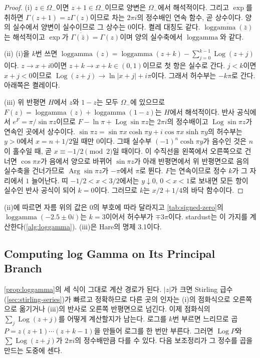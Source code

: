 \begin{proof}
(i) $z\in\Omega_-$이면 $z+1\in\Omega_-$이므로 양변은 $\Omega_-$에서 해석적이다. 그리고 $\exp$를 취하면 $\Gamma(z+1)=z\Gamma(z)$이므로 차는 $2\pi i$의 정수배인 연속 함수, 곧 상수이다. 양의 실수에서 양변이 실수이므로 그 상수는 $0$이다. 켤레 대칭도 같다. $\overline{\operatorname{loggamma}(\bar z)}$는 해석적이고 $\exp$가 $\overline{\Gamma(\bar z)}=\Gamma(z)$이며 양의 실수축에서 $\operatorname{loggamma}$와 같다.

(ii) (i)을 $k$번 쓰면 $\operatorname{loggamma}(z)=\operatorname{loggamma}(z+k)-\sum_{j=0}^{k-1}\operatorname{Log}(z+j)$이다. $z\to x+i0$이면 $z+k\to x+k\in(0,1)$이므로 첫 항은 실수로 간다. $j<k$이면 $x+j<0$이므로 $\operatorname{Log}(z+j)\to\ln|x+j|+i\pi$이다. 그래서 허수부는 $-k\pi$로 간다. 아래쪽은 켤레이다.

(iii) 위 반평면 $H$에서 $z$와 $1-z$는 모두 $\Omega_-$에 있으므로 $F(z)=\operatorname{loggamma}(z)+\operatorname{loggamma}(1-z)$는 $H$에서 해석적이다. 반사 공식에서 $e^F=\pi/\sin\pi z$이므로 $F-\ln\pi+\operatorname{Log}\sin\pi z$는 $2\pi i$의 정수배이고 $\operatorname{Log}\sin\pi z$가 연속인 곳에서 상수이다. $\sin\pi z=\sin\pi x\cosh\pi y+i\cos\pi x\sinh\pi y$의 허수부는 $y>0$에서 $x=n+1/2$일 때만 $0$이다. 그때 실수부 $(-1)^n\cosh\pi y$가 음수인 것은 $n$이 홀수일 때, 곧 $x\equiv-1/2\pmod2$일 때이다. 이 수직선을 왼쪽에서 오른쪽으로 건너면 $\cos\pi x$가 음에서 양으로 바뀌어 $\sin\pi z$가 아래 반평면에서 위 반평면으로 음의 실수축을 건너가므로 $\operatorname{Arg}\sin\pi z$가 $-\pi$에서 $\pi$로 뛴다. $F$는 연속이므로 정수 $k$가 그 자리에서 $1$ 늘어난다. 띠 $-1/2<x<3/2$에서는 $y\downarrow0$, $0<x<1$로 보내면 모든 항이 실수인 반사 공식이 되어 $k=0$이다. 그러므로 $k$는 $x/2+1/4$의 바닥 함수이다.
\end{proof}

(ii)에 따르면 자름 위의 값은 $0$의 부호에 따라 달라지고 \cref{tab:signed-zero}의 $\operatorname{loggamma}(-2.5\pm0i)$는 $k=3$이어서 허수부가 $\mp3\pi$이다. stardust는 이 가지를 계산한다(\cref{alg:loggamma}). (iii)은 Hare\cite{hare1997loggamma}의 명제 3.1이다.

\subsection{Computing log Gamma on Its Principal Branch}

\cref{prop:loggamma}의 세 식이 그대로 계산 경로가 된다. $|z|$가 크면 Stirling 급수(\cref{sec:stirling-series})가 빠르고 정확하므로 다른 곳의 인자는 (i)의 점화식으로 오른쪽으로 옮기거나 (iii)의 반사로 오른쪽 반평면으로 넘긴다. 이제 점화식의 $\sum_j\operatorname{Log}(z+j)$를 어떻게 계산할지가 남는다. 로그를 $k$번 부르면 느리므로 곱 $P=z(z+1)\cdots(z+k-1)$을 만들어 로그를 한 번만 부른다. 그러면 $\operatorname{Log}P$와 $\sum\operatorname{Log}(z+j)$가 $2\pi i$의 정수배만큼 다를 수 있다. 다음 보조정리가 그 정수를 곱을 만드는 도중에 센다.

